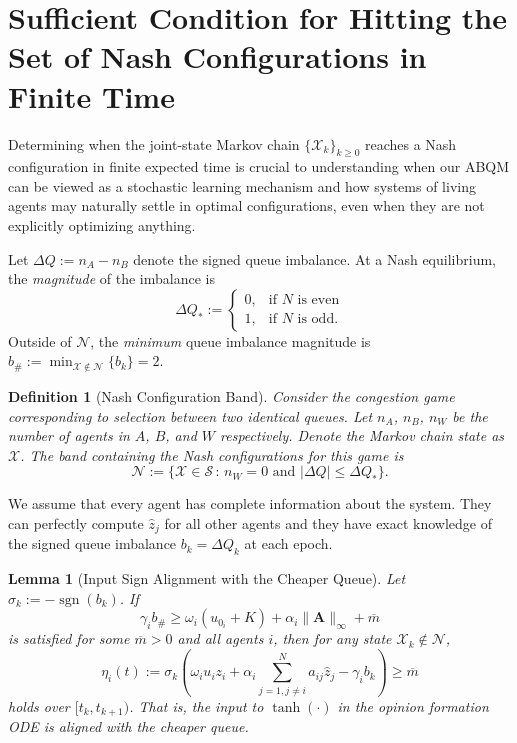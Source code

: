\documentclass[conference]{IEEEtran}
\DeclareMathOperator{\sgn}{sgn}
\newtheorem{definition}{Definition}
\newtheorem{lemma}{Lemma}
\begin{document}
\section{Sufficient Condition for Hitting the Set of Nash Configurations in Finite Time}\label{sec:nash_hitting}
Determining when the joint-state Markov chain $\{\mathcal{X}_k\}_{k \ge 0}$ reaches a Nash configuration in finite expected time is crucial to understanding when our ABQM can be viewed as a stochastic learning mechanism and how systems of living agents may naturally settle in optimal configurations, even when they are not explicitly optimizing anything. 

Let $\Delta Q := n_A - n_B$ denote the signed queue imbalance. At a Nash equilibrium, the \emph{magnitude} of the imbalance is
\begin{equation*}
   \Delta Q_* := \begin{cases}
0, & \text{if } N \text{ is even}\\
1, & \text{if } N \text{ is odd}.
\end{cases} 
\end{equation*}
Outside of $\mathcal{N}$, the \emph{minimum} queue imbalance magnitude is $b_{\#} := \min_{\mathcal{X} \notin \mathcal{N}}\{b_k\} = 2$.
\begin{definition}[Nash Configuration Band]
    Consider the congestion game corresponding to selection between two identical queues. Let $n_A$, $n_B$, $n_W$ be the number of agents in $A$, $B$, and $W$ respectively. Denote the Markov chain state as $\mathcal{X}$. The band containing the Nash configurations for this game is
    \begin{equation}
        \mathcal{N} := \{\mathcal{X} \in \mathcal{S} \, : \, n_W = 0 \text{ and } |\Delta Q| \leq \Delta Q_*\}.
    \end{equation}
\end{definition}
We assume that every agent has complete information about the system. They can perfectly compute $\hat{z}_j$ for all other agents and they have exact knowledge of the signed queue imbalance $b_k = \Delta Q_k$ at each epoch. 
\begin{lemma}[Input Sign Alignment with the Cheaper Queue]\label{lemma:cheaper_queue_input_alignment}
    Let $\sigma_k := -\sgn(b_k)$. If 
    \begin{equation}
        \gamma_i b_{\#} \ge \omega_i(u_{0_i} + K) + \alpha_i\|\boldsymbol{A}\|_{\infty} + \overline{m}
    \end{equation}
    is satisfied for some $\overline{m} > 0$ and all agents $i$, then for any state $\mathcal{X}_k \notin \mathcal{N}$,
    \begin{equation*}
        \eta_i(t) := \sigma_k\left(\omega_i u_i z_i + \alpha_i \sum^N_{j = 1, j\neq i}a_{ij}\hat{z}_j - \gamma_i b_k \right) \ge \overline{m}
    \end{equation*}
    holds over $[t_k, t_{k+1})$. That is, the input to $\tanh(\cdot)$ in the opinion formation ODE is aligned with the cheaper queue.
\end{lemma}
\end{document}
